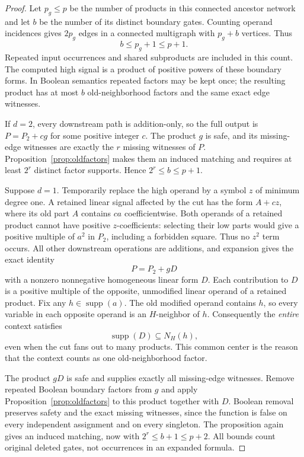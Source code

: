 \documentclass[11pt]{article}
\newcommand{\supp}{\operatorname{supp}}
\theoremstyle{definition}
\theoremstyle{remark}
\begin{document}
\begin{proof}
Let $p_g\le p$ be the number of products in this connected ancestor network and let $b$ be the number of its distinct boundary gates. Counting operand incidences gives $2p_g$ edges in a connected multigraph with $p_g+b$ vertices. Thus
\[
 b\le p_g+1\le p+1.
\]
Repeated input occurrences and shared subproducts are included in this count. The computed high signal is a product of positive powers of these boundary forms. In Boolean semantics repeated factors may be kept once; the resulting product has at most $b$ old-neighborhood factors and the same exact edge witnesses.

If $d=2$, every downstream path is addition-only, so the full output is $P=P_2+c g$ for some positive integer $c$. The product $g$ is safe, and its missing-edge witnesses are exactly the $r$ missing witnesses of $P$. Proposition~\ref{prop:oldfactors} makes them an induced matching and requires at least $2^r$ distinct factor supports. Hence $2^r\le b\le p+1$.

Suppose $d=1$. Temporarily replace the high operand by a symbol $z$ of minimum degree one. A retained linear signal affected by the cut has the form $A+c z$, where its old part $A$ contains $c a$ coefficientwise. Both operands of a retained product cannot have positive $z$-coefficients: selecting their low parts would give a positive multiple of $a^2$ in $P_2$, including a forbidden square. Thus no $z^2$ term occurs. All other downstream operations are additions, and expansion gives the exact identity
\[
 P=P_2+gD
\]
with a nonzero nonnegative homogeneous linear form $D$. Each contribution to $D$ is a positive multiple of the opposite, unmodified linear operand of a retained product. Fix any $h\in\supp(a)$. The old modified operand contains $h$, so every variable in each opposite operand is an $H$-neighbor of $h$. Consequently the \emph{entire} context satisfies
\[
 \supp(D)\subseteq N_H(h),
\]
even when the cut fans out to many products. This common center is the reason that the context counts as one old-neighborhood factor.

The product $gD$ is safe and supplies exactly all missing-edge witnesses. Remove repeated Boolean boundary factors from $g$ and apply Proposition~\ref{prop:oldfactors} to this product together with $D$. Boolean removal preserves safety and the exact missing witnesses, since the function is false on every independent assignment and on every singleton. The proposition again gives an induced matching, now with $2^r\le b+1\le p+2$. All bounds count original deleted gates, not occurrences in an expanded formula.
\end{proof}
\end{document}
